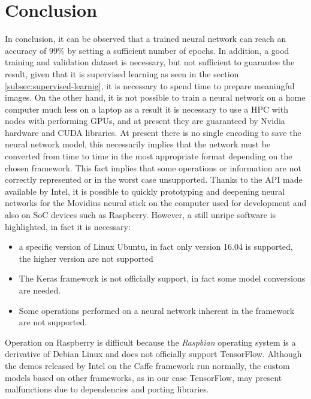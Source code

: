 \section{Conclusion}
\label{sec:conclusion}
In conclusion, it can be observed that a trained neural network can reach an 
accuracy of $99\%$ by setting a sufficient number of epochs. In addition, a 
good training and validation dataset is necessary, but not sufficient to 
guarantee the result, given that it is supervised learning as seen in the 
section \ref{subsec:supervised-learnig}, it is necessary to spend time to 
prepare meaningful images.
On the other hand, it is not possible to train a neural network on a home 
computer much less on a laptop as a result it is necessary to use a HPC with 
nodes with performing GPUs, and at present they are guaranteed by Nvidia 
hardware and CUDA libraries.
At present there is no single encoding to save the neural network model, this 
necessarily implies that the network must be converted from time to time in 
the most appropriate format depending on the chosen framework.
This fact implies that some operations or information are not correctly 
represented or in the worst case unsupported.
Thanks to the API made available by Intel, it is possible to quickly 
prototyping and deepening neural networks for the Movidius neural stick on the 
computer used for development and also on SoC devices such as Raspberry.
However, a still unripe software is highlighted, in fact it is necessary:
\begin{itemize}
\item a specific version of Linux Ubuntu, in fact only version 16.04 is 
supported, the higher version are not supported
\item The Keras framework is not officially support, in fact some model 
conversions are needed.
\item Some operations performed on a neural network inherent in the framework 
are not supported.
\end{itemize}
Operation on Raspberry is difficult because the \emph{Raspbian} operating system
is a derivative of Debian Linux and does not officially support TensorFlow.
Although the demos released by Intel on the Caffe framework run normally, the
custom models based on other frameworks, as in our case TensorFlow, may present 
malfunctions due to dependencies and porting libraries.
